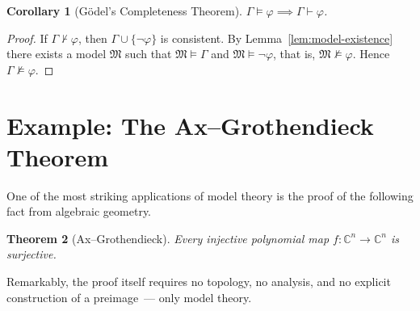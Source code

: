 \documentclass[12pt, a4paper]{article}
\theoremstyle{plain}
\newtheorem{theorem}{Theorem}
\newtheorem{corollary}[theorem]{Corollary}
\theoremstyle{definition}
\newcommand{\proves}{\vdash}
\renewcommand{\models}{\vDash}
\newcommand{\Struct}{\mathfrak{M}}
\begin{document}
\begin{corollary}[G\"odel's Completeness Theorem]
$\Gamma \models \varphi \implies \Gamma \proves \varphi$.
\end{corollary}

\begin{proof}
If $\Gamma \not\proves \varphi$, then $\Gamma \cup \{\neg\varphi\}$ is consistent.
By Lemma~\ref{lem:model-existence} there exists a model $\Struct$ such
that $\Struct \models \Gamma$ and $\Struct \models \neg\varphi$,
that is, $\Struct \not\models \varphi$.
Hence $\Gamma \not\models \varphi$.
\end{proof}

\section{Example: The Ax--Grothendieck Theorem}

One of the most striking applications of model theory is the proof of the
following fact from algebraic geometry.

\begin{theorem}[Ax--Grothendieck]
Every injective polynomial map $f \colon \mathbb{C}^n \to \mathbb{C}^n$
is surjective.
\end{theorem}

Remarkably, the proof itself requires no topology,
no analysis, and no explicit construction of a preimage~--- only model theory.
\end{document}
